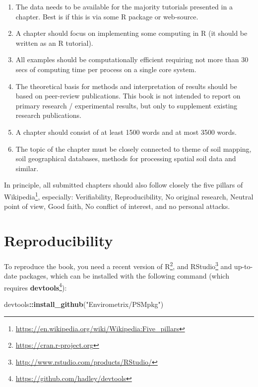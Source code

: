 \documentclass[graybox,natbib,nospthms,UStrade]{svmono}
\newenvironment{Shaded}{\begin{snugshade}}{\end{snugshade}}
\newcommand{\KeywordTok}[1]{\textcolor[rgb]{0.27,0.27,0.27}{\textbf{#1}}}
\newcommand{\NormalTok}[1]{#1}
\newcommand{\OperatorTok}[1]{\textcolor[rgb]{0.43,0.43,0.43}{\textbf{#1}}}
\newcommand{\StringTok}[1]{\textcolor[rgb]{0.5,0.5,0.5}{#1}}
\providecommand{\tightlist}{%
  \setlength{\itemsep}{0pt}\setlength{\parskip}{0pt}}
\providecommand{\tightlist}{\setlength{\itemsep}{0pt}\setlength{\parskip}{0pt}}
\renewcommand{\href}[2]{#2 (\url{#1})}
\renewcommand{\href}[2]{#2\footnote{\url{#1}}}
\begin{document}
\begin{enumerate}
\def\labelenumi{\arabic{enumi}.}
\tightlist
\item
  The data needs to be available for the majority tutorials presented in a chapter. Best is if this is via some R package or web-source.
\item
  A chapter should focus on implementing some computing in R (it should be written as an R tutorial).
\item
  All examples should be computationally efficient requiring not more than 30 secs of computing time per process on a single core system.
\item
  The theoretical basis for methods and interpretation of results should be based on peer-review publications. This book is not intended to report on primary research / experimental results, but only to supplement existing research publications.
\item
  A chapter should consist of at least 1500 words and at most 3500 words.
\item
  The topic of the chapter must be closely connected to theme of soil mapping, soil geographical databases, methods for processing spatial soil data and similar.
\end{enumerate}

In principle, all submitted chapters should also follow closely the \href{https://en.wikipedia.org/wiki/Wikipedia:Five_pillars}{five pillars of Wikipedia}, especially: Verifiability, Reproducibility, No original research, Neutral point of view, Good faith, No conflict of interest, and no personal attacks.

\hypertarget{reproducibility}{%
\section*{Reproducibility}\label{reproducibility}}

To reproduce the book, you need a recent version of \href{https://cran.r-project.org}{R}, and \href{http://www.rstudio.com/products/RStudio/}{RStudio} and up-to-date packages, which can be installed with the following command (which requires \href{https://github.com/hadley/devtools}{\textbf{devtools}}):

\begin{Shaded}
\begin{Highlighting}[]
\NormalTok{devtools}\OperatorTok{::}\KeywordTok{install_github}\NormalTok{(}\StringTok{"Envirometrix/PSMpkg"}\NormalTok{)}
\end{Highlighting}
\end{Shaded}
\end{document}
